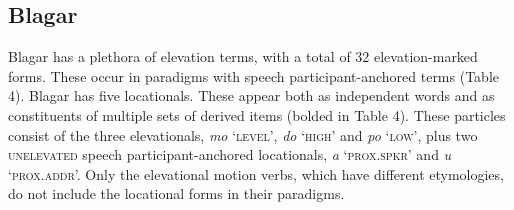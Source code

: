 \subsection{Blagar}
Blagar has a plethora of elevation terms, with a total of 32 elevation-marked forms. These occur in paradigms with speech participant-anchored terms (Table 4). Blagar has five locationals. These appear both as independent words and as constituents of multiple sets of derived items (bolded in Table 4). These particles consist of the three elevationals, \textit{mo} `\textsc{level',} \textit{do} `\textsc{high'} and \textit{po} `\textsc{low',} plus two \textsc{unelevated} speech participant-anchored locationals, \textit{{\textglotstop}}\textit{a} `\textsc{prox.spkr'} and \textit{{\textglotstop}}\textit{u} `\textsc{prox.addr'.} Only the elevational motion verbs, which have different etymologies, do not include the locational forms in their paradigms. 



